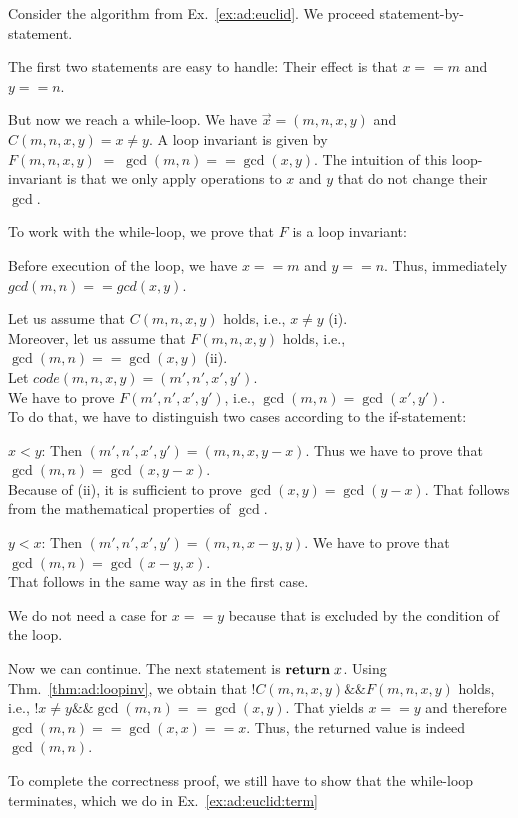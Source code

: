 \begin{example}\label{ex:ad:euclid:loopinv}
Consider the algorithm from Ex.~\ref{ex:ad:euclid}.
We proceed statement-by-statement.
\medskip

The first two statements are easy to handle: Their effect is that $x==m$ and $y==n$.
\medskip

But now we reach a while-loop.
We have $\vec{x}=(m,n,x,y)$ and $C(m,n,x,y)=x\neq y$.
A loop invariant is given by $F(m,n,x,y)\;=\;\gcd(m,n)==\gcd(x,y)$.
The intuition of this loop-invariant is that we only apply operations to $x$ and $y$ that do not change their $\gcd$.
\medskip

To work with the while-loop, we prove that $F$ is a loop invariant:
\begin{compactitem}
 \item Before execution of the loop, we have $x==m$ and $y==n$. Thus, immediately $gcd(m,n)==gcd(x,y)$.
 \item Let us assume that $C(m,n,x,y)$ holds, i.e., $x\neq y$ (i).\\
  Moreover, let us assume that $F(m,n,x,y)$ holds, i.e., $\gcd(m,n)==\gcd(x,y)$ (ii).\\
  Let $code(m,n,x,y)=(m',n',x',y')$.\\
  We have to prove $F(m',n',x',y')$, i.e., $\gcd(m,n)=\gcd(x',y')$.\\
  To do that, we have to distinguish two cases according to the if-statement:
  \begin{compactitem}
   \item $x<y$: Then $(m',n',x',y') = (m,n,x,y-x)$.
   Thus we have to prove that $\gcd(m,n)=\gcd(x,y-x)$.\\
   Because of (ii), it is sufficient to prove $\gcd(x,y)=\gcd(y-x)$.
   That follows from the mathematical properties of $\gcd$.
   \item $y<x$: Then $(m',n',x',y') = (m,n,x-y,y)$.
   We have to prove that $\gcd(m,n)=\gcd(x-y,x)$.\\
   That follows in the same way as in the first case.
   \item We do not need a case for $x==y$ because that is excluded by the condition of the loop.
  \end{compactitem}
\end{compactitem}
\medskip

Now we can continue.
The next statement is $\areturn{x}$.
Using Thm.~\ref{thm:ad:loopinv}, we obtain that $!C(m,n,x,y)\&\& F(m,n,x,y)$ holds, i.e., $!x\neq y \&\& \gcd(m,n)==\gcd(x,y)$.
That yields $x==y$ and therefore $\gcd(m,n)==\gcd(x,x)==x$.
Thus, the returned value is indeed $\gcd(m,n)$.

To complete the correctness proof, we still have to show that the while-loop terminates, which we do in Ex.~\ref{ex:ad:euclid:term}
\end{example}

